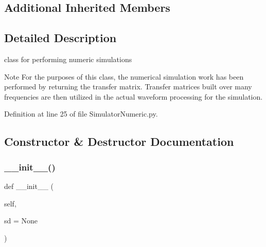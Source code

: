 \subsection*{Additional Inherited Members}


\subsection{Detailed Description}
class for performing numeric simulations 

\begin{DoxyNote}{Note}
For the purposes of this class, the numerical simulation work has been performed by returning the transfer matrix. Transfer matrices built over many frequencies are then utilized in the actual waveform processing for the simulation. 
\end{DoxyNote}


Definition at line 25 of file Simulator\+Numeric.\+py.



\subsection{Constructor \& Destructor Documentation}
\mbox{\label{classSignalIntegrity_1_1SystemDescriptions_1_1SimulatorNumeric_1_1SimulatorNumeric_a2fa2ae61a4511a760e2d2047ec07eb05}} 
\subsubsection{\texorpdfstring{\+\_\+\+\_\+init\+\_\+\+\_\+()}{\_\_init\_\_()}}
{\footnotesize\ttfamily def \+\_\+\+\_\+init\+\_\+\+\_\+ (\begin{DoxyParamCaption}\item[{}]{self,  }\item[{}]{sd = {\ttfamily None} }\end{DoxyParamCaption})}



